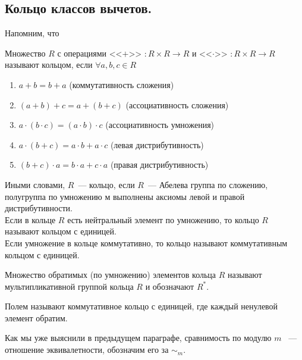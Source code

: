 \documentclass[11pt]{article}
\begin{document}
\subsection{Кольцо классов вычетов.}
Напомним, что
\begin{definition}
	Множество $R$ с операциями <<$+$>> $\colon R \times R \to R$ и <<$\cdot$>> $\colon R \times R \to R$  называют кольцом, если
	$\forall a, b, c \in R$
	\begin{enumerate}
	    \item $a + b = b + a$ (коммутативность сложения)

		\item $(a + b) + c = a + (b + c)$ (ассоциативность сложения)

		\item $a \cdot (b \cdot c) = (a \cdot b) \cdot c$ (ассоциативность умножения)

		\item $a \cdot (b + c) = a \cdot b + a \cdot c$ (левая дистрибутивность)

		\item $(b + c) \cdot a = b \cdot a + c \cdot a$ (правая дистрибутивность)
	\end{enumerate}
	Иными словами, $R$~--- кольцо, если $R$~--- Абелева группа по сложению, полугруппа по умножению м выполнены аксиомы левой и правой
	дистрибутивности. \\
	Если в кольце $R$ есть нейтральный элемент по умножению, то кольцо $R$ называют кольцом с единицей. \\
	Если умножение в кольце коммутативно, то кольцо называют коммутативным кольцом с единицей. \\
\end{definition}
\begin{definition}
	Множество обратимых (по умножению) элементов кольца $R$ называют мультипликативной группой кольца $R$ и обозначают $R^{*}$.
\end{definition}
\begin{definition}
	Полем называют коммутативное кольцо с единицей, где каждый ненулевой элемент обратим.
\end{definition}

Как мы уже выяснили в предыдущем параграфе, сравнимость по модулю $m$ ~--- отношение эквивалетности, обозначим его за $\sim_{m}$.
\end{document}
